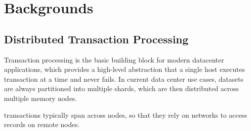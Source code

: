 
\section{Backgrounds}   \label{sec:background}

\ifx\undefined\stale
\subsection{Distributed Transaction Processing}    \label{subsec:kvs_primary}





Transaction processing is the basic building block for modern datacenter applications, which provides a high-level abstraction that a single host executes transaction at a time and never fails. In current data center use cases, datasets are always partitioned into multiple shards, which are then distributed across multiple memory nodes. 

transactions typically span across nodes, so that they rely on networks to access records on remote nodes. 




